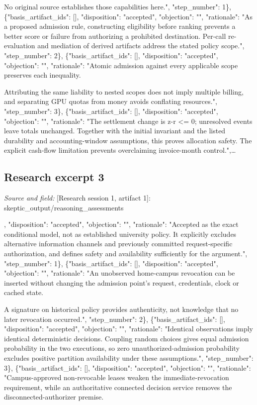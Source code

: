\documentclass[11pt]{article}
\begin{document}
No original source establishes those capabilities here.", "step\_number": 1\}, \{"basis\_artifact\_ids": [], "disposition": "accepted", "objection": "", "rationale": "As a proposed admission rule, constructing eligibility before ranking prevents a better score or failure from authorizing a prohibited destination. Per-call re-evaluation and mediation of derived artifacts address the stated policy scope.", "step\_number": 2\}, \{"basis\_artifact\_ids": [], "disposition": "accepted", "objection": "", "rationale": "Atomic admission against every applicable scope preserves each inequality.

Attributing the same liability to nested scopes does not imply multiple billing, and separating GPU quotas from money avoids conflating resources.", "step\_number": 3\}, \{"basis\_artifact\_ids": [], "disposition": "accepted", "objection": "", "rationale": "The settlement change is z-r \textless{}= 0; unresolved events leave totals unchanged. Together with the initial invariant and the listed durability and accounting-window assumptions, this proves allocation safety. The explicit cash-flow limitation prevents overclaiming invoice-month control.",\ldots{}

\subsection{Research excerpt 3}
\textit{Source and field: }[Research session 1, artifact 1]: skeptic\_output/reasoning\_assessments\par
[\{"basis\_artifact\_ids": [], "disposition": "accepted", "objection": "", "rationale": "Accepted as the exact conditional model, not as established university policy. It explicitly excludes alternative information channels and previously committed request-specific authorization, and defines safety and availability sufficiently for the argument.", "step\_number": 1\}, \{"basis\_artifact\_ids": [], "disposition": "accepted", "objection": "", "rationale": "An unobserved home-campus revocation can be inserted without changing the admission point's request, credentials, clock or cached state.

A signature on historical policy provides authenticity, not knowledge that no later revocation occurred.", "step\_number": 2\}, \{"basis\_artifact\_ids": [], "disposition": "accepted", "objection": "", "rationale": "Identical observations imply identical deterministic decisions. Coupling random choices gives equal admission probability in the two executions, so zero unauthorized-admission probability excludes positive partition availability under these assumptions.", "step\_number": 3\}, \{"basis\_artifact\_ids": [], "disposition": "accepted", "objection": "", "rationale": "Campus-approved non-revocable leases weaken the immediate-revocation requirement, while an authoritative connected decision service removes the disconnected-authorizer premise.
\end{document}
